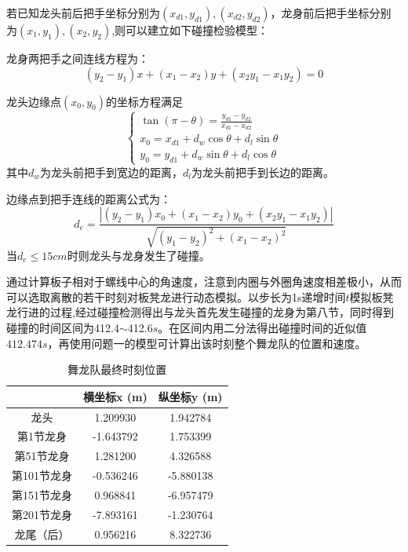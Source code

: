 \documentclass[withoutpreface,bwprint]{cumcmthesis} %
\begin{document}
若已知龙头前后把手坐标分别为$\left ( x_{d1},y_{d1} \right ) ,\left ( x_{d2},y_{d2} \right )$，龙身前后把手坐标分别为$\left ( x_{1},y_{1} \right ) ,\left ( x_{2},y_{2} \right )$,则可以建立如下碰撞检验模型：

龙身两把手之间连线方程为：
$$
\left ( y_{2}-y_{1}   \right ) x+\left ( x_{1}-x_{2}   \right ) y+\left ( x_{2}y_{1}-x_{1}y_{2}     \right )=0 
$$

龙头边缘点$\left ( x_{0},y_{0} \right )$的坐标方程满足
$$
\begin{cases}\tan \left ( \pi - \theta  \right ) =\frac{y_{d1}-y_{d2}}{x_{d1}-x_{d2}} \\x_{0}=x_{d1}+d_{w}\cos \theta +d_{l}\sin \theta  \\y_{0}=y_{d1}+d_{w}\sin \theta +d_{l}\cos \theta \end{cases}
$$
其中$d_{w}$为龙头前把手到宽边的距离，$d_{l}$为龙头前把手到长边的距离。

边缘点到把手连线的距离公式为：
$$
d_{e}=\frac{\left | \left ( y_{2}-y_{1}    \right )x_{0} +\left ( x_{1}-x_{2}   \right ) y_{0}+\left ( x_{2}y_{1}-x_{1}y_{2}     \right )    \right | }{\sqrt{\left ( y_{1}-y_{2}    \right )^{2}+\left ( x_{1}-x_{2}   \right ) ^{2}   } } 
$$
 当$d_{e}\le 15cm$时则龙头与龙身发生了碰撞。

通过计算板子相对于螺线中心的角速度，注意到内圈与外圈角速度相差极小，从而可以选取离散的若干时刻对板凳龙进行动态模拟。以步长为1s递增时间$t$模拟板凳龙行进的过程,经过碰撞检测得出与龙头首先发生碰撞的龙身为第八节，同时得到碰撞的时间区间为412.4$\sim $412.6$s$。在区间内用二分法得出碰撞时间的近似值$412.474s$，再使用问题一的模型可计算出该时刻整个舞龙队的位置和速度。

\begin{table}[H]
	\centering
	\caption{舞龙队最终时刻位置}
	\begin{tabular}{|c|c|c|}
		\hline
   &横坐标x (m)&纵坐标y (m)\\ \hline
龙头 &1.209930 &1.942784 \\ \hline
第1节龙身 &-1.643792 &1.753399 \\ \hline
第51节龙身 &1.281200 &4.326588 \\ \hline
第101节龙身 &-0.536246 &-5.880138 \\ \hline
第151节龙身 &0.968841 &-6.957479 \\ \hline
第201节龙身 &-7.893161 &-1.230764 \\ \hline
龙尾（后） &0.956216 &8.322736 \\ \hline
	\end{tabular}
\end{table}
\end{document}
